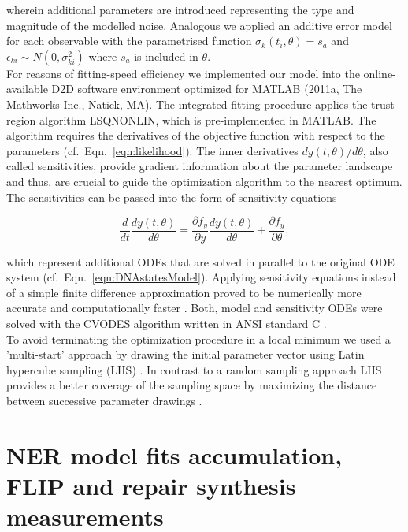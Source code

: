 wherein additional parameters are introduced representing the type and magnitude of the modelled noise. Analogous we applied an additive error model for each observable with the parametrised function $\sigma_{k}(t_i,\theta) = s_a$ and $\epsilon_{ki} \sim N(0,\sigma_{ki}^2)$ where $s_a$ is included in $\theta$.\\ 
For reasons of fitting-speed efficiency we implemented our model into the online-available D2D software environment \cite{Raue2013} optimized for MATLAB (2011a, The Mathworks Inc., Natick, MA). The integrated fitting procedure applies the trust region algorithm LSQNONLIN, which is pre-implemented in MATLAB. The algorithm requires the derivatives of the objective function with respect to the parameters (cf.\ Eqn.\ \ref{eqn:likelihood}). The inner derivatives $dy(t,\theta)/d\theta$, also called sensitivities, provide gradient information about the parameter landscape and thus, are crucial to guide the optimization algorithm to the nearest optimum. The sensitivities can be passed into the form of sensitivity equations 

\begin{equation}
	\frac{d}{dt}\frac{dy(t,\theta)}{d\theta} = \frac{\partial f_y}{\partial y}\frac{dy(t,\theta)}{d\theta}+\frac{\partial f_y}{\partial \theta},
\end{equation}  

which represent additional ODEs that are solved in parallel to the original ODE system (cf.\ Eqn.\ \ref{eqn:DNAstatesModel})\cite{Leis1988}. Applying sensitivity equations instead of a simple finite difference approximation proved to be numerically more accurate and computationally faster \cite{Raue2013}. Both, model and sensitivity ODEs were solved with the CVODES algorithm written in ANSI standard C \cite{Hindmarsh2005}. \\
To avoid terminating the optimization procedure in a local minimum we used a 'multi-start' approach by drawing the initial parameter vector using Latin hypercube sampling (LHS) \cite{Owen2014}. In contrast to a random sampling approach LHS provides a better coverage of the sampling space by maximizing the distance between successive parameter drawings \cite{Raue2013}.    





\section{NER model fits accumulation, FLIP and repair synthesis measurements}    

